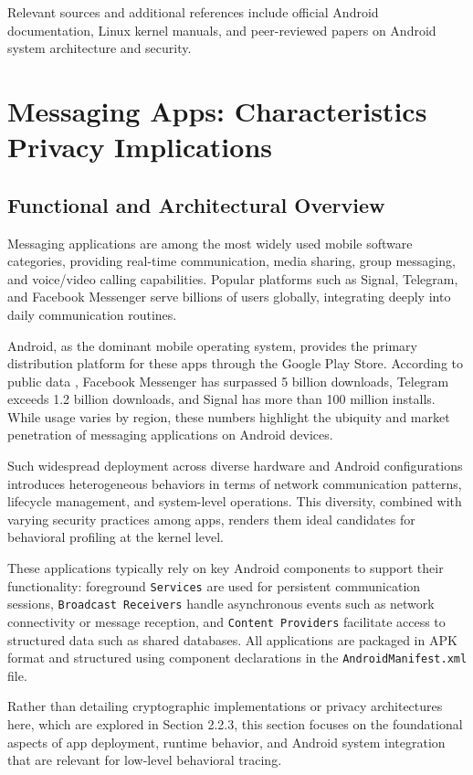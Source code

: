 \documentclass[a4paper,12pt]{report}
\begin{document}
Relevant sources and additional references include official Android documentation, Linux kernel manuals, and peer-reviewed papers on Android system architecture and security.
\section{Messaging Apps: Characteristics  Privacy Implications}

\subsection{Functional and Architectural Overview}
Messaging applications are among the most widely used mobile software categories, providing real-time communication, media sharing, group messaging, and voice/video calling capabilities. Popular platforms such as Signal, Telegram, and Facebook Messenger serve billions of users globally, integrating deeply into daily communication routines.

Android, as the dominant mobile operating system, provides the primary distribution platform for these apps through the Google Play Store. According to public data \cite{statista2024messaging, googleplaydata2024}, Facebook Messenger has surpassed 5 billion downloads, Telegram exceeds 1.2 billion downloads, and Signal has more than 100 million installs. While usage varies by region, these numbers highlight the ubiquity and market penetration of messaging applications on Android devices.

Such widespread deployment across diverse hardware and Android configurations introduces heterogeneous behaviors in terms of network communication patterns, lifecycle management, and system-level operations. This diversity, combined with varying security practices among apps, renders them ideal candidates for behavioral profiling at the kernel level.

These applications typically rely on key Android components to support their functionality: foreground \texttt{Services} are used for persistent communication sessions, \texttt{Broadcast Receivers} handle asynchronous events such as network connectivity or message reception, and \texttt{Content Providers} facilitate access to structured data such as shared databases. All applications are packaged in APK format and structured using component declarations in the \texttt{AndroidManifest.xml} file.

Rather than detailing cryptographic implementations or privacy architectures here, which are explored in Section 2.2.3, this section focuses on the foundational aspects of app deployment, runtime behavior, and Android system integration that are relevant for low-level behavioral tracing.
\end{document}
